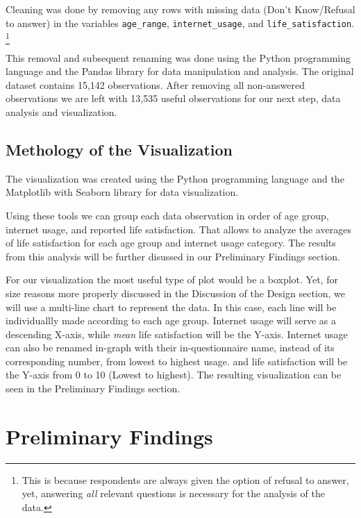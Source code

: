 \documentclass[12pt, a4paper]{article}
\begin{document}
\normalsize \bigskip

\par Cleaning was done by removing any rows with missing data \footnotesize(Don't Know/Refusal to answer) \normalsize in the variables \texttt{age\_range}, \texttt{internet\_usage}, and \texttt{life\_satisfaction}.
\footnote{This is because respondents are always given the option of refusal to answer, yet, answering \textit{all} relevant questions is necessary for the analysis of the data.}
\par This removal and subsequent renaming was done using the Python programming language and the Pandas library for data manipulation and analysis.
The original dataset contains 15,142 observations. After removing all non-answered observations we are left with 13,535 useful observations for our next step, data analysis and visualization.

\subsection{Methology of the Visualization}

\par The visualization was created using the Python programming language and the Matplotlib with Seaborn library for data visualization.
\par Using these tools we can group each data observation in order of age group, internet usage, and reported life satisfaction.
That allows to analyze the averages of life satisfaction for each age group and internet usage category.
The results from this analysis will be further disussed in our Preliminary Findings section.
\par For our visualization the most useful type of plot would be a boxplot.
Yet, for size reasons more properly discussed in the Discussion of the Design section, we will use a multi-line chart to represent the data.
In this case, each line will be individuallly made according to each age group.
Internet usage will serve as a descending X-axis, while \textit{mean} life satisfaction will be the Y-axis.
Internet usage can also be renamed in-graph with their in-questionnaire name, instead of its corresponding number, from lowest to highest usage.
and life satisfaction will be the Y-axis from 0 to 10 {\footnotesize(Lowest to highest)}.
The resulting visualization can be seen in the Preliminary Findings section.


\section{Preliminary Findings}
\end{document}
